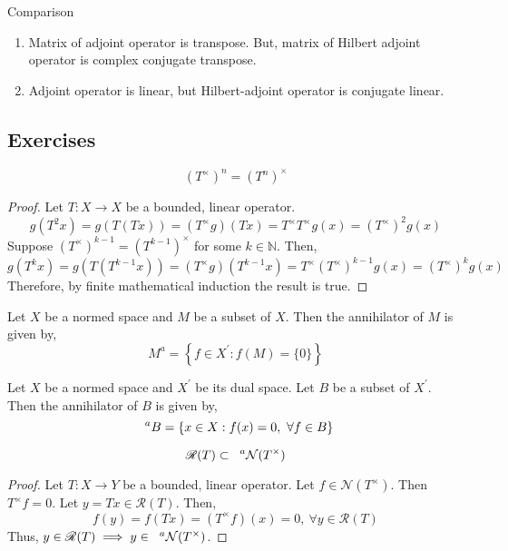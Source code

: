 \begin{remark}Comparison
\begin{enumerate}
	\item Matrix of adjoint operator is transpose. But, matrix of Hilbert adjoint operator is complex conjugate transpose.
	\item Adjoint operator is linear, but Hilbert-adjoint operator is conjugate linear.
\end{enumerate}
\end{remark}

\subsection*{Exercises}
\cite[\S 4.5 Exercise 6]{kreyszig}
\begin{remark}
	\[ (T^\times)^n = (T^n)^\times \]
\end{remark}
\begin{proof}
	Let $T : X \to X$ be a bounded, linear operator.
	\[ g(T^2 x) = g(T(Tx)) = (T^\times g)(Tx) = T^\times T^\times g(x) = (T^\times)^2 g(x) \]
	Suppose $(T^\times)^{k-1} = (T^{k-1})^\times$ for some $k \in \mathbb{N}$.
	Then,
	\[ g(T^k x) = g(T(T^{k-1}x)) = (T^\times g)(T^{k-1}x) = T^\times (T^\times)^{k-1} g(x) = (T^\times)^k g(x) \]
	Therefore, by finite mathematical induction the result is true.
\end{proof}

\begin{definition}
	Let $X$ be a normed space and $M$ be a subset of $X$.
	Then the annihilator of $M$ is given by,
	\[ M^a = \left\{ f \in X^\prime : f(M) = \{ 0 \} \right\} \]
\end{definition}

\begin{definition}
	Let $X$ be a normed space and $X^\prime$ be its dual space.
	Let $B$ be a subset of $X^\prime$.
	Then the annihilator of $B$ is given by,
	\[ \hphantom{x}^aB = \{ x \in X : f(x) = 0,\ \forall f \in B \} \] %
\end{definition}

\begin{remark}
	\[ \mathscr{R}(T) \subset \hphantom{x}^a\mathcal{N}(T^\times) \]
\end{remark}
\begin{proof}
	Let $T : X \to Y$ be a bounded, linear operator.
	Let $f \in \mathcal{N}(T^\times)$.
	Then $T^\times f = 0$.
	Let $y = Tx \in \mathscr{R}(T)$.
	Then,
	\[ f(y) = f(Tx) = (T^\times f) (x) = 0,\ \forall y \in \mathscr{R}(T) \]
	Thus, $y \in \mathscr{R}(T) \implies y \in \hphantom{x}^a\mathcal{N}(T^\times)$.
\end{proof}

